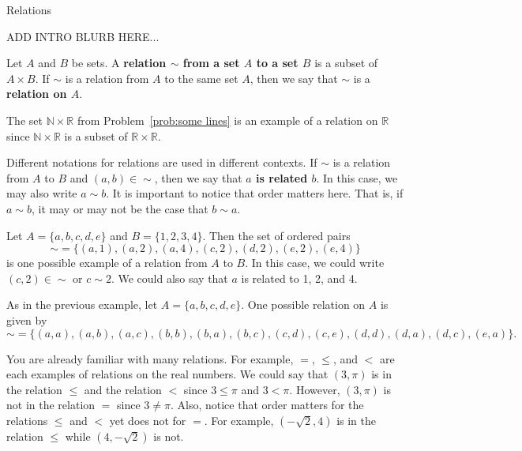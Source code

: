 \begin{section}{Relations}

ADD INTRO BLURB HERE...

\begin{definition}
Let $A$ and $B$ be sets. A \textbf{relation $\sim$ from a set $A$ to a set $B$} is a subset of $A \times B$. If $\sim$ is a relation from $A$ to the same set $A$, then we say that $\sim$ is a \textbf{relation on $A$}.  
\end{definition}

\begin{example}
The set $\mathbb{N}\times \mathbb{R}$ from Problem~\ref{prob:some lines} is an example of a relation on $\mathbb{R}$ since $\mathbb{N}\times \mathbb{R}$ is a subset of $\mathbb{R}\times \mathbb{R}$.
\end{example}

Different notations for relations are used in different contexts.  If $\sim$ is a relation from $A$ to $B$ and $(a,b)\in {\sim}$, then we say that \textbf{$a$ is related $b$}.  In this case, we may also write $a\sim b$.  It is important to notice that order matters here.  That is, if $a\sim b$, it may or may not be the case that $b\sim a$.

\begin{example}\label{ex:relation finite to finite}
Let $A=\{a,b,c,d,e\}$ and $B=\{1,2,3,4\}$. Then the set of ordered pairs
\[
{\sim}=\{(a,1),(a,2),(a,4),(c,2),(d,2),(e,2),(e,4)\}
\]
is one possible example of a relation from $A$ to $B$. In this case, we could write $(c,2)\in{\sim}$ or $c\sim 2$. We could also say that $a$ is related to 1, 2, and 4. 
\end{example}

\begin{example}\label{ex:relation on finite}
As in the previous example, let $A=\{a,b,c,d,e\}$. One possible relation on $A$ is given by
\[
{\sim}=\{(a,a),(a,b),(a,c),(b,b),(b,a),(b,c),(c,d),(c,e),(d,d),(d,a),(d,c),(e,a)\}.
\]
\end{example}

\begin{example}
You are already familiar with many relations.  For example, $=$, $\leq$, and $<$ are each examples of relations on the real numbers. We could say that $(3,\pi)$ is in the relation $\leq$ and the relation $<$ since $3\leq \pi$ and $3<\pi$.  However, $(3,\pi)$ is not in the relation $=$ since $3\neq \pi$.  Also, notice that order matters for the relations $\leq$ and $<$ yet does not for $=$. For example, $(-\sqrt{2}, 4)$ is in the relation $\leq$ while $(4,-\sqrt{2})$ is not.
\end{example}


\end{section}
